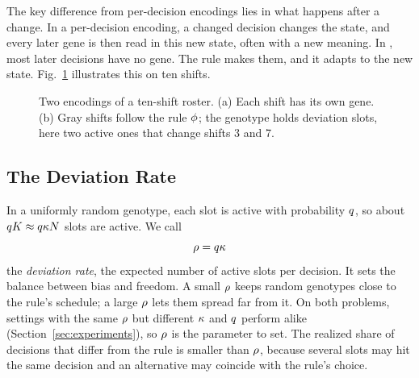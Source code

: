The key difference from per-decision encodings lies in what happens after a change.
In a per-decision encoding, a changed decision changes the state, and every later gene is then read in this new state, often with a new meaning.
In \RDD, most later decisions have no gene.
The rule makes them, and it adapts to the new state.
Fig.~\ref{fig:encoding} illustrates this on ten shifts.

\begin{figure}[t]
  \centering
  \caption{Two encodings of a ten-shift roster. (a) Each shift has its own gene. (b) Gray shifts follow the rule $\phi$; the genotype holds deviation slots, here two active ones that change shifts 3 and 7.}
  \label{fig:encoding}
\end{figure}

\subsection{The Deviation Rate}
\label{sec:method:rate}

In a uniformly random genotype, each slot is active with probability $q$, so about $qK \approx q\kappa N$ slots are active.
We call
\begin{equation}
  \rho = q\kappa
\end{equation}
the \emph{deviation rate}, the expected number of active slots per decision.
It sets the balance between bias and freedom.
A small $\rho$ keeps random genotypes close to the rule's schedule; a large $\rho$ lets them spread far from it.
On both problems, settings with the same $\rho$ but different $\kappa$ and $q$ perform alike (Section~\ref{sec:experiments}), so $\rho$ is the parameter to set.
The realized share of decisions that differ from the rule is smaller than $\rho$, because several slots may hit the same decision and an alternative may coincide with the rule's choice.

